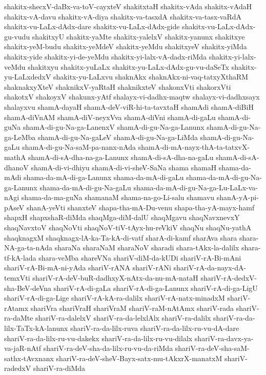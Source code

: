 {shakitx-shecxV-daBx-va-toV-cayxteV
shakitxtaH
shakitx-vAda
shakitx-vAdaH
shakitx-vA-davu
shakitx-vA-diya
shakitx-va-tasxdA
shakitx-va-tasx-vaRdA
shakitx-vu-LaLx-dAdx-dare
shakitx-vu-LaLx-dAdx-gide
shakitx-vu-LaLx-dAdx-gu-vudu
shakitxyU
shakitx-yaMte
shakitx-yalelxV
shakitx-yanunx
shakitxye
shakitx-yeM-budu
shakitx-yeMdeV
shakitx-yeMdu
shakitxyeV
shakitx-yiMda
shakitx-yide
shakitx-yi-de-yeMdu
shakitx-yi-lalx-vA-dadx-riMda
shakitx-yi-lalx-veMdu
shakitxyu
shakitx-yuLaLx
shakitx-yu-LaLx-dAdx-gu-vu-daSeTx
shakitx-yu-LaLxdedxV
shakitx-yu-LaLxvu
shaknAkx
shaknAkx-ni-vaq-tatxyXthaRM
shaknakxyXteV
shaknikxV-yaRtaH
shaknikxteV
shakonxVti
shakorxVti
shakotxV
shakoyxV
shakunx-yAtf
shalayx-vi-dadhx-maqtw
shalayx-vi-dadhxsayx
shalayxvu
shamA-dayaH
shamA-deV-viR-hi-ta-tavxtaH
shamAdi
shamA-diBiH
shamA-diVnAM
shamA-diV-neyxVva
shamA-diVni
shamA-di-gaLu
shamA-di-guNa
shamA-di-gu-Na-ga-LanenxV
shamA-di-gu-Na-ga-Lanunx
shamA-di-gu-Na-ga-LeMba
shamA-di-gu-Na-gaLeV
shamA-di-gu-Na-ga-LiMda
shamA-di-gu-Na-gaLu
shamA-di-gu-Na-saM-pa-nanx-nAda
shamA-di-mA-nayx-thA-ta-tatxvX-mathA
shamA-di-sA-dha-na-ga-Lanunx
shamA-di-sA-dha-na-gaLu
shamA-di-sA-dhanoV
shamA-di-vi-dhiyu
shamA-di-vi-sheV-SaNa
shama
shamaH
shama-da-mAdi
shama-da-mA-di-ga-Lanunx
shama-da-mA-di-gaLu
shama-da-mA-di-gu-Na-ga-Lanunx
shama-da-mA-di-gu-Na-gaLu
shama-da-mA-di-gu-Na-ga-Lu-LaLx-va-nAgi
shama-da-ma-guNa
shamanaM
shama-na-go-Li-salu
shamavu
shanA-yA-pi-pAseV
shanA-yeVti
shanxteV
shapa-tha-mA-Du-venu
shapa-tha-yA-mayx-hamf
shapxH
shapxshaR-diMda
shaqMga-diM-dalU
shaqMgavu
shaqNavxnevxY
shaqNavxtoV
shaqNoVti
shaqNoV-tiV-tAyx-hu-reVkiV
shaqNu
shaqNu-yathA
shaqknagxM
shaqknagx-lA-ka-Ta-kA-di-vatf
sharA-di-kamf
sharAva
shara
shara-NA-ga-ta-nAda
sharaNa
sharaNaM
sharaNoV
sharadi
shara-tAkx-la-dalilx
shara-tf-kA-lada
shara-veMba
shareVNa
shariV-diM-da-kUDi
shariV-rA-Bi-mAni
shariV-rA-Bi-mA-ni-yAda
shariV-rANA
shariV-rANi
shariV-rA-da-nayx-dA-temxVti
shariV-rA-deV-buR-dadhxyX-nAtx-da-nu-mA-nataH
shariV-rA-dedxV-sha-BeV-deVna
shariV-rA-di-gaLa
shariV-rA-di-ga-Lanunx
shariV-rA-di-ga-LigU
shariV-rA-di-ga-Lige
shariV-rA-kA-ra-dalilx
shariV-rA-natx-minadxM
shariV-rAtamx
shariVra
shariVraH
shariVraM
shariV-raM-nAtAmx
shariV-rada
shariV-ra-daMte
shariV-ra-dalelxV
shariV-ra-da-lelxlAlx
shariV-ra-dalilx
shariV-ra-da-lilx-TaTx-kA-lanunx
shariV-ra-da-lilx-ruva
shariV-ra-da-lilx-ru-vu-dA-dare
shariV-ra-da-lilx-ru-vu-dakekx
shariV-ra-da-lilx-ru-vu-dilalx
shariV-ra-davx-ya-va-jaR-nAtf
shariV-ra-deV-sha-da-lilx-ru-vu-da-riMda
shariV-ra-deV-sha-saM-sathx-tAvxnanx
shariV-ra-deV-sheV-Bayx-satx-mu-tAkxrX-manatxM
shariV-radedxV
shariV-ra-diMda
}
